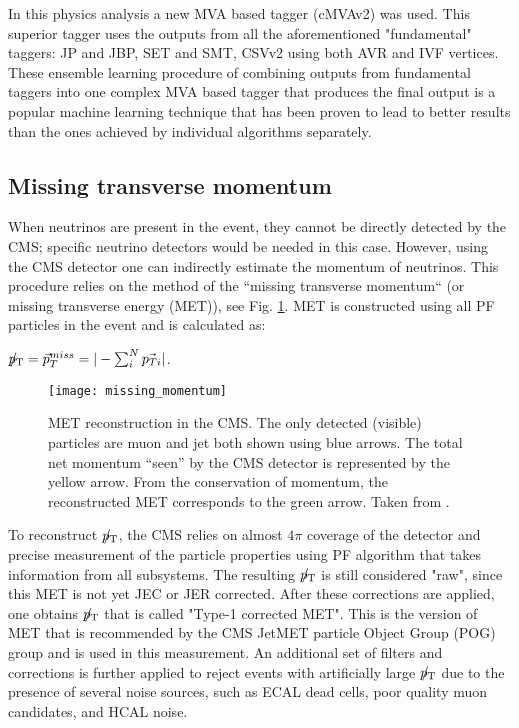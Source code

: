 In this physics analysis a new MVA based tagger (cMVAv2) was used. This superior tagger uses the outputs from all the aforementioned "fundamental" taggers: JP and JBP, SET and SMT, CSVv2 using both AVR and IVF vertices. These ensemble learning procedure \cite{ensemble_learning} of combining outputs from fundamental taggers into one complex MVA based tagger that produces the final output is a popular machine learning technique that has been proven to lead to better results than the ones achieved by individual algorithms separately. 

\subsection{Missing transverse momentum}\label{sec:met}

When neutrinos are present in the event, they cannot be directly detected by the CMS; specific neutrino detectors would be needed in this case. However, using the CMS detector one can indirectly estimate the momentum of neutrinos. This procedure relies on the method of the ``missing  transverse momentum`` \PTslash (or missing transverse energy  \ETslash (MET)), see Fig. \ref{missing_momentum}.  MET is constructed using all PF particles in the event and is calculated as:

${p}_\mathrm{T}\hspace{-1.02em}/\kern 0.5em = \vec{p}^{miss}_T = |- \sum^N_i \vec{p_{Ti}} |$. 




 \begin{figure}[H]
  \centering
  \texttt{[image: missing\_momentum]}
  \caption[MET reconstruction in the CMS.]{MET reconstruction in the CMS. The only detected (visible) particles are muon and jet both shown using blue arrows. The total net momentum ``seen'' by the CMS detector is represented by the yellow arrow. From the conservation of momentum, the reconstructed MET corresponds to the green arrow. Taken from \cite{missing_momentum}. }
  \label{missing_momentum}
\end{figure}





To reconstruct ${p}_\mathrm{T}\hspace{-1.02em}/\kern 0.5em$, the CMS relies on almost $4 \pi$ coverage of the detector and precise measurement of the particle properties using PF algorithm that takes information from all subsystems. The resulting ${p}_\mathrm{T}\hspace{-1.02em}/\kern 0.5em$ is still considered "raw", since this MET is not yet JEC or JER corrected. After these corrections are applied, one obtains  ${p}_\mathrm{T}\hspace{-1.02em}/\kern 0.5em$ that is called "Type-1 corrected MET". This is the version of MET that is recommended by the CMS JetMET particle Object Group (POG) group and is used in this measurement. An additional set of filters and corrections is further applied to reject events with artificially large ${p}_\mathrm{T}\hspace{-1.02em}/\kern 0.5em$ due to the presence of several noise sources, such as ECAL dead cells, poor quality muon candidates, and HCAL noise. 

